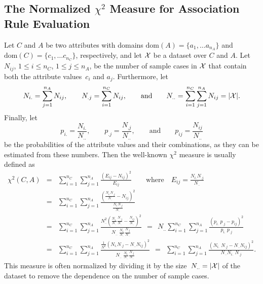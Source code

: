 \documentclass[a4paper]{article}
\begin{document}
\subsection*{The Normalized $\chi^2$ Measure
             for Association Rule Evaluation}

Let $C$ and $A$ be two attributes with domains
$\mbox{dom}(A) = \{ a_1, \ldots a_{n_A} \}$ and
$\mbox{dom}(C) = \{ c_1, \ldots c_{n_C} \}$, respectively,
and let $\cal X$ be a dataset over $C$ and $A$.
Let $N_{ij}$, $1 \le i \le n_C$, $1 \le j \le n_A$, be the number of
sample cases in $\cal X$ that contain both the attribute values~$c_i$
and $a_j$. Furthermore, let
\[ N_{i.} = \sum_{j=1}^{n_A} N_{ij}, \qquad
   N_{.j} = \sum_{i=1}^{n_C} N_{ij}, \qquad\mbox{and}\qquad
   N_{..} = \sum_{i=1}^{n_C} \sum_{j=1}^{n_A} N_{ij} = |{\cal X}|. \]
Finally, let
\[ p_{i.} = \frac{N_{i.}}{N_{..}}, \qquad
   p_{.j} = \frac{N_{.j}}{N_{..}}, \qquad\mbox{and}\qquad
   p_{ij} = \frac{N_{ij}}{N_{..}} \]
be the probabilities of the attribute values and their combinations,
as they can be estimated from these numbers. Then the well-known
$\chi^2$ measure is usually defined as
\begin{eqnarray*}
\chi^2(C,A)
& = & \sum_{i=1}^{n_C} \sum_{j=1}^{n_A}
      \frac{(E_{ij} -N_{ij})^2}{E_{ij}}
      \qquad\mbox{where}\quad E_{ij} = \frac{N_{i.}N_{.j}}{N_{..}} \\
& = & \sum_{i=1}^{n_C} \sum_{j=1}^{n_A}
      \frac{\left(\frac{N_{i.}N_{.j}}{N_{..}} -N_{ij}\right)^2}
           {\frac{N_{i.}N_{.j}}{N_{..}}} \\
& = & \sum_{i=1}^{n_C} \sum_{j=1}^{n_A}
      \frac{N_{..}^2 \left(\frac{N_{i.}}{N_{..}}
                           \frac{N_{.j}}{N_{..}}
                         - \frac{N_{ij}}{N_{..}}\right)^2}
           {N_{..}\;       \frac{N_{i.}}{N_{..}}
                           \frac{N_{.j}}{N_{..}}}
~~=~~ N_{..} \sum_{i=1}^{n_C} \sum_{j=1}^{n_A}
      \frac{(p_{i.}\;p_{.j} - p_{ij})^2}{p_{i.}\;p_{.j}} \\
& = & \sum_{i=1}^{n_C} \sum_{j=1}^{n_A}
      \frac{\frac{1}{N_{..}^2} \left(N_{i.}N_{.j}
                              - N_{..}N_{ij}\right)^2}
           {N_{..}\;       \frac{N_{i.}}{N_{..}}
                           \frac{N_{.j}}{N_{..}}}
~~=~~ \sum_{i=1}^{n_C} \sum_{j=1}^{n_A}
      \frac{(N_{i.}\;N_{.j} - N_{..}N_{ij})^2}{N_{..} N_{i.}\;N_{.j}}.
\end{eqnarray*}
This measure is often normalized by dividing it by the
size~$N_{..} = |{\cal X}|$ of the dataset to remove the
dependence on the number of sample cases.
\end{document}
